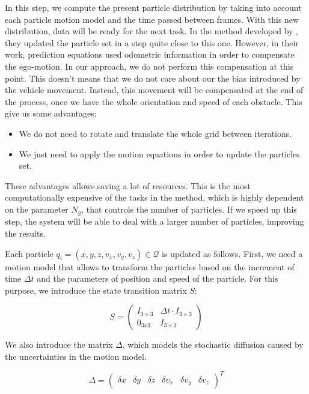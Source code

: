 In this step, we compute the present particle distribution by taking into account each particle motion model and the time passed between frames. With this new distribution, data will be ready for the next task. In the method developed by \cite{danescu2012particle}, they updated the particle set in a step quite close to this one. However, in their work, prediction equations used odometric information in order to compensate the ego-motion. In our approach, we do not perform this compensation at this point. This doesn't means that we do not care about our the bias introduced by the vehicle movement. Instead, this movement will be compensated at the end of the process, once we have the whole orientation and speed of each obstacle. This give us some advantages:
\begin{itemize}
 \item We do not need to rotate and translate the whole grid between iterations.
 \item We just need to apply the motion equations in order to update the particles set.
\end{itemize}

These advantages allows saving a lot of resources. This is the most computationally expensive of the tasks in the method, which is highly dependent on the parameter $N_g$, that controls the number of particles. If we speed up this step, the system will be able to deal with a larger number of particles, improving the results.

Each particle $q_i = (x, y, z, v_x, v_y, v_z) \in \mathcal{Q}$ is updated as follows. First, we need a motion model that allows to transform the particles based on the increment of time $\Delta t$ and the parameters of position and speed of the particle. For this purpose, we introduce the state transition matrix $S$:

\begin{equation}\label{eq:cp05_state_transition_matrix}
S =
\left( \begin{array}{cc}
I_{3\times3} & \Delta t \cdot I_{3\times3} \\
0_{3x3} & I_{3\times3} \end{array} \right)
\end{equation}

We also introduce the matrix $\Delta$, which models the stochastic diffusion caused by the uncertainties in the motion model.

\begin{equation}\label{eq:cp05_state_motion_model_uncertainties}
\Delta =
\left( \begin{array}{cccccc}
\delta x & \delta y & \delta z & \delta v_x & \delta v_y & \delta v_z
\end{array} \right)^T
\end{equation}


